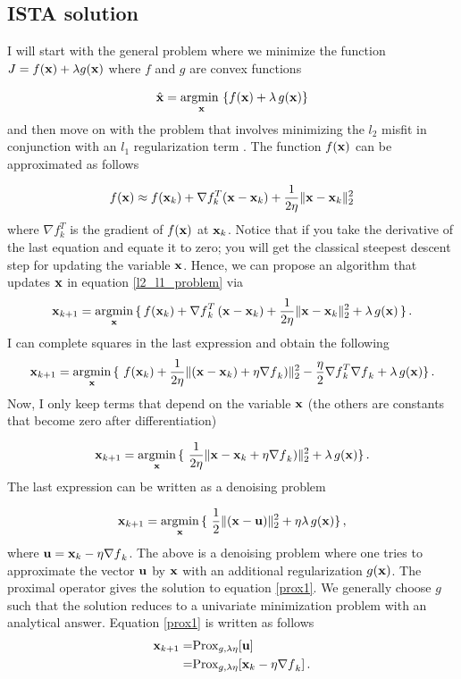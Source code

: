 \documentclass[11pt, oneside]{article}  	%
\def\be{\vspace{0.0cm}\begin{equation}}
\def\ee{\vspace{0.0cm}\end{equation}}
\def\nin{\noindent}
\begin{document}
\subsection{ISTA solution}
I will start with the general problem where we minimize
the function $J= f({\bf x}) + \lambda g({\bf x})$ where $f$ and $g$ are convex functions

\be 
\hat{{\bf x }} = \underset{{\bf x}}{\mbox{argmin }} \{ f({\bf x}) + \lambda\, g({\bf x}) \} \label{general}
\ee
and then move on with the problem that involves minimizing the $l_2$ misfit in conjunction with an $l_1$ regularization term \citep{ISTA}.
The function $f({\bf x})$ can be approximated as follows 

\be f({\bf x}) \approx f({\bf x}_k) + \nabla f_k^T ({\bf x} - {\bf x}_k) + \frac{1}{2\eta} \| {\bf x} - {\bf x}_k\|_2^2
\label{approx} 
\ee
\nin
where $\nabla f_k^T$ is the gradient of $f({\bf x})$ at ${\bf x}_k$. Notice that if you take the derivative of the last equation and
equate it to zero; you will get the classical steepest descent step for updating the variable $\bf x$.
Hence, we can propose an algorithm that updates $\bf x$ in equation \ref{l2_l1_problem} via 
\be
{\bf x}_{k+1} = \underset{{\bf x}}{\mbox{argmin}} \, \{\, f({\bf x}_k) + {\nabla f}_k^T \,({\bf x} - {\bf x}_k) + \frac{1}{2\eta} \| {\bf x} - {\bf x}_k\|_2^2 +\lambda \,g({\bf x}) \,\}\,.
\ee
I can complete squares in the last expression and obtain the following 
\be
{\bf x}_{k+1} = \underset{{\bf x}}{\mbox{argmin}} \, \{\
  f({\bf x}_k)+ \frac{1}{2\eta} \| ({\bf x}- {\bf x}_k) + \eta {\nabla f}_k)\|_2^2- \frac{\eta}{2} {\nabla f}_k^T {\nabla f}_k + \lambda \,g({\bf x}) \}
  \,.
\ee
Now, I only keep terms that depend on the variable $\bf x$ (the others are constants that become zero after
differentiation)  

\be
{\bf x}_{k+1} = \underset{{\bf x}}{\mbox{argmin}} \, \{\
 \frac{1}{2\eta} \| {\bf x}- {\bf x}_k + \eta {\nabla f}_k)\|_2^2 + \lambda \,g({\bf x}) \}\,.
\ee
The last expression can be written as a denoising problem

\be
{\bf x}_{k+1} = \underset{{\bf x}}{\mbox{argmin}} \, \{\
 \frac{1}{2} \| ({\bf x} - {\bf u} )\|_2^2 + \eta \lambda \,g({\bf x}) \}\,, \label{prox1}
\ee
where ${\bf u} = {\bf x}_k - \eta {\nabla f}_k$. The above is a denoising problem where one tries to approximate the vector $
\bf u$ by $\bf x$ with an additional regularization $g({\bf x})$. The proximal operator gives the solution to equation \ref{prox1}. We generally choose $g$ such that the solution reduces to a univariate minimization problem with an analytical answer. Equation \ref{prox1} is written as follows
\begin{align}
{\bf x}_{k+1} =& \mbox{Prox}_{g,\lambda \eta} [{\bf u}]\\
           =& \mbox{Prox}_{g,\lambda \eta} [{\bf x}_{k} - \eta {\nabla f}_k]\,. \label{last} 
\end{align}
\end{document}
